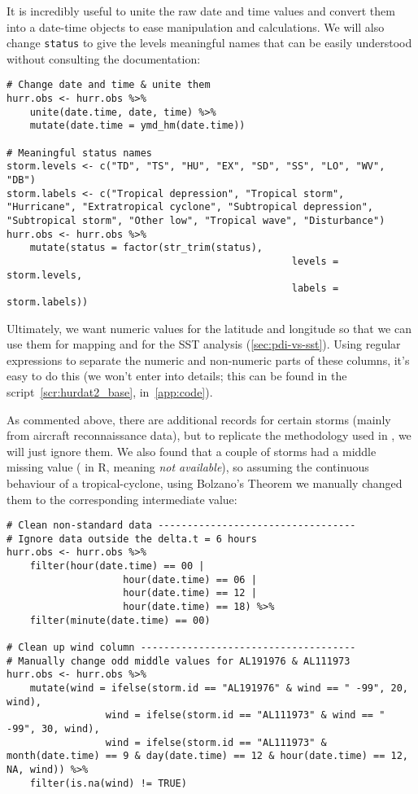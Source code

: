 It is incredibly useful to unite the raw date and time values and convert them into a date-time objects to ease manipulation and calculations. We will also change \texttt{status} to give the levels meaningful names that can be easily understood without consulting the documentation:
\begin{lstlisting}[caption=Change date-time and use meaningful status names, label=snp:hurdat-clean2]
# Change date and time & unite them
hurr.obs <- hurr.obs %>%
	unite(date.time, date, time) %>%
	mutate(date.time = ymd_hm(date.time))

# Meaningful status names
storm.levels <- c("TD", "TS", "HU", "EX", "SD", "SS", "LO", "WV", "DB")
storm.labels <- c("Tropical depression", "Tropical storm", "Hurricane", "Extratropical cyclone", "Subtropical depression", "Subtropical storm", "Other low", "Tropical wave", "Disturbance")
hurr.obs <- hurr.obs %>%
	mutate(status = factor(str_trim(status),
												 levels = storm.levels,
												 labels = storm.labels))
\end{lstlisting}

Ultimately, we want numeric values for the latitude and longitude so that we can use them for mapping and for the SST analysis (\cref{sec:pdi-vs-sst}). Using regular expressions to separate the numeric and non-numeric parts of these columns, it's easy to do this (we won't enter into details; this can be found in the script~\ref{scr:hurdat2_base}, in~\cref{app:code}).

As commented above, there are additional records for certain storms (mainly from aircraft reconnaissance data), but to replicate the methodology used in \cite{Corral2010}, we will just ignore them. We also found that a couple of storms had a middle missing value ( in R, meaning \emph{not available}), so assuming the continuous behaviour of a tropical-cyclone, using Bolzano's Theorem we manually changed them to the corresponding intermediate value:
\begin{lstlisting}[caption=Clean non-standard data and odd middle values for certain storms, label=snp:hurdat-clean3]
# Clean non-standard data ----------------------------------
# Ignore data outside the delta.t = 6 hours
hurr.obs <- hurr.obs %>%
	filter(hour(date.time) == 00 |
					hour(date.time) == 06 |
					hour(date.time) == 12 |
					hour(date.time) == 18) %>%
	filter(minute(date.time) == 00)

# Clean up wind column -------------------------------------
# Manually change odd middle values for AL191976 & AL111973
hurr.obs <- hurr.obs %>%
	mutate(wind = ifelse(storm.id == "AL191976" & wind == " -99", 20, wind),
				 wind = ifelse(storm.id == "AL111973" & wind == " -99", 30, wind),
				 wind = ifelse(storm.id == "AL111973" & month(date.time) == 9 & day(date.time) == 12 & hour(date.time) == 12, NA, wind)) %>%
	filter(is.na(wind) != TRUE)
\end{lstlisting}


